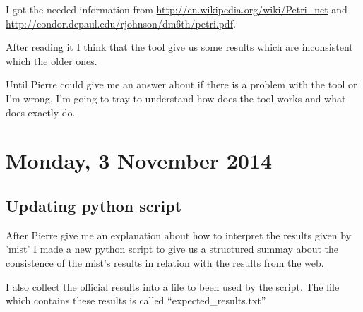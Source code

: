 \documentclass[nochap]{apuntes}
\begin{document}
I got the needed information from \url{http://en.wikipedia.org/wiki/Petri_net} and \url{http://condor.depaul.edu/rjohnson/dm6th/petri.pdf}.

After reading it I think that the tool give us some results which are inconsistent which the older ones.

Until Pierre could give me an answer about if there is a problem with the tool or I'm wrong, I'm going to tray to understand how does the tool works and what does exactly do.

\section{Monday, 3 November 2014}
\subsection{Updating python script}
After Pierre give me an explanation about how to interpret the results given by 'mist' I made a new python script to give us a structured summay about the consistence of the mist's results in relation with the results from the web.

I also collect the official results into a file to been used by the script. The file which contains these results is called ``expected\_results.txt''

\normalsize
\printindex
\end{document}
